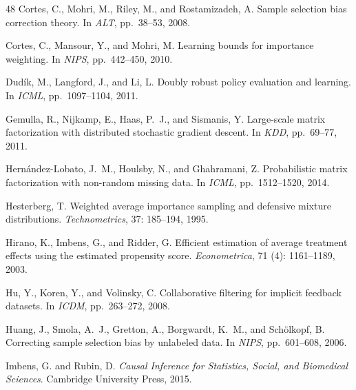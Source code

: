 \documentclass{article}
\begin{document}
\begin{thebibliography}{48}
Cortes, C., Mohri, M., Riley, M., and Rostamizadeh, A.
\newblock Sample selection bias correction theory.
\newblock In \emph{ALT}, pp.\  38--53, 2008.

Cortes, C., Mansour, Y., and Mohri, M.
\newblock Learning bounds for importance weighting.
\newblock In \emph{NIPS}, pp.\  442--450, 2010.

Dud{\'i}k, M., Langford, J., and Li, L.
\newblock Doubly robust policy evaluation and learning.
\newblock In \emph{ICML}, pp.\  1097–1104, 2011.

Gemulla, R., Nijkamp, E., Haas, P.~J., and Sismanis, Y.
\newblock Large-scale matrix factorization with distributed stochastic gradient
  descent.
\newblock In \emph{KDD}, pp.\  69--77, 2011.

Hernández-Lobato, J.~M., Houlsby, N., and Ghahramani, Z.
\newblock Probabilistic matrix factorization with non-random missing data.
\newblock In \emph{ICML}, pp.\  1512--1520, 2014.

Hesterberg, T.
\newblock Weighted average importance sampling and defensive mixture
  distributions.
\newblock \emph{Technometrics}, 37: 185--194, 1995.

Hirano, K., Imbens, G., and Ridder, G.
\newblock Efficient estimation of average treatment effects using the estimated
  propensity score.
\newblock \emph{Econometrica}, 71 (4): 1161--1189, 2003.

Hu, Y., Koren, Y., and Volinsky, C.
\newblock Collaborative filtering for implicit feedback datasets.
\newblock In \emph{ICDM}, pp.\  263--272, 2008.

Huang, J., Smola, A.~J., Gretton, A., Borgwardt, K.~M., and Sch{\"o}lkopf, B.
\newblock Correcting sample selection bias by unlabeled data.
\newblock In \emph{NIPS}, pp.\  601--608, 2006.

Imbens, G. and Rubin, D.
\newblock \emph{Causal Inference for Statistics, Social, and Biomedical
  Sciences}.
\newblock Cambridge University Press, 2015.


\end{thebibliography}
\end{document}
